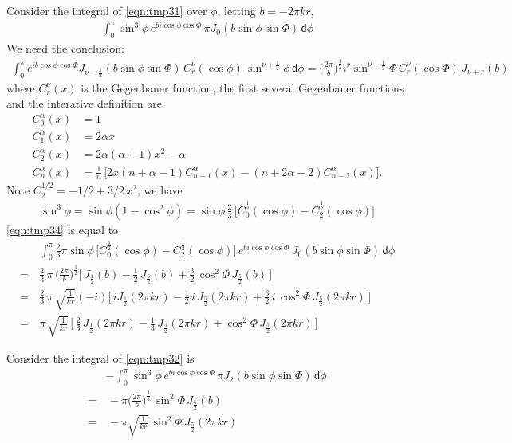 \documentclass[aps,pre,preprint]{revtex4}
\renewcommand{\d}[1]{\textsf{#1}}
\begin{document}
Consider the integral of \eqref{eqn:tmp31} over $\phi$, letting $b = -2\pi kr$,
\begin{align}\label{eqn:tmp34}
  \int_0^\pi
  \sin^3\phi\, e^{bi\cos\phi\cos\Phi}\,\pi J_0(b\sin\phi\sin\Phi)\,
  \d d\phi
\end{align}
We need the conclusion:
\begin{align}
  \int_0^\pi
  e^{ib\cos\phi\cos\Phi}
  J_{\nu-\frac12}(b\sin\phi\sin\Phi)\,
  C_r^\nu(\cos\phi)\,
  \sin^{\nu + \frac12}\phi
  \,\d d\phi
  =
  \Big(\frac{2\pi}{b}\Big)^{\frac12}
  i^r
  \sin^{\nu - \frac12}\Phi\,
  C_r^\nu(\cos\Phi)\,
  J_{\nu + r}(b)
\end{align}
where $C_r^\nu(x)$ is the Gegenbauer function, the first several
Gegenbauer functions and the interative definition are
\begin{align}
  C_0^\alpha (x) &= 1 \\
  C_1^\alpha(x) &= 2\alpha x\\
  C_2^\alpha(x) &= 2\alpha(\alpha + 1) x^2 - \alpha\\
  C_n^\alpha(x) & = \frac{1}{n}\,\Big[
  2x(n+\alpha-1)C_{n-1}^\alpha(x) - (n+2\alpha-2)C_{n-2}^\alpha(x)
  \Big].
\end{align}
Note $C_2^{1/2} = -1/2 + 3/2\,x^2$, we have
\begin{align}
  \sin^3\phi = \sin\phi(1-\cos^2\phi)=
  \sin\phi\,\frac23\,\Big[
  C_0^{\frac12}(\cos\phi) - C_2^{\frac12}(\cos\phi)
  \Big]
\end{align}
\eqref{eqn:tmp34} is equal to
\begin{align}\nonumber
  &\int_0^\pi
  \frac23\pi\sin\phi\,
  \Big[
  C_0^{\frac12}(\cos\phi) - C_2^{\frac12}(\cos\phi)
  \Big]
  \, e^{bi\cos\phi\cos\Phi}\, J_0(b\sin\phi\sin\Phi)\,
  \d d\phi   \\ \nonumber
  = \,&
  \frac23\, \pi\,
  \Big( \frac{2\pi}b \Big )^{\frac12}
  \Big[\,
  J_{\frac12}(b) - \frac12\,J_{\frac52}(b) +
  \frac32\,\cos^2\Phi\, J_{\frac52}(b)
  \,\Big] \\ \nonumber
  = \,&
  \frac23\, \pi\,
  \sqrt{ \frac1{kr} }(-i)
  \Big[\,
  iJ_{\frac12}(2\pi kr) -  \frac12\,i\,J_{\frac52}(2\pi kr) +
  \frac32\,i\,\cos^2\Phi\, J_{\frac52}(2\pi kr)
  \,\Big] \\
  = \,&
  \pi\,
  \sqrt{ \frac1{kr} }\,
  \Big[\,
  \frac23\,J_{\frac12}(2\pi kr) -  \frac13\,J_{\frac52}(2\pi kr) +
  \cos^2\Phi\, J_{\frac52}(2\pi kr)
  \,\Big] 
\end{align}

Consider the integral of \eqref{eqn:tmp32} is
\begin{align}\nonumber
  &-\int_0^\pi
  \sin^3\phi\, e^{bi\cos\phi\cos\Phi}\,\pi J_2(b\sin\phi\sin\Phi)\,
  \d d\phi \\ \nonumber
  = &\, 
  -\pi \Big( \frac{2\pi}b \Big )^{\frac12}\,
  \sin^2\Phi\,
  J_{\frac52}(b) \\
  = &\, 
  -\pi \sqrt{ \frac1{kr} }\,
  \sin^2\Phi\,
  J_{\frac52}(2\pi kr) 
\end{align}
\end{document}
